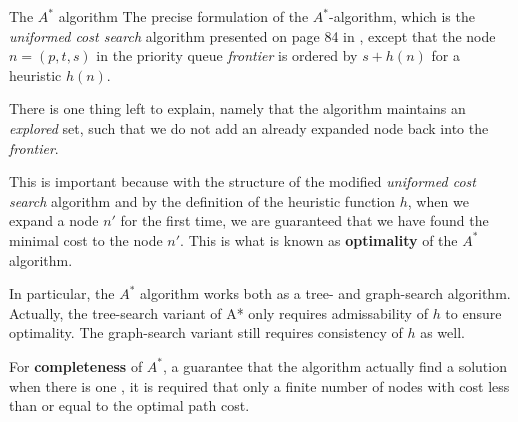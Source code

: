 \newpage
\begin{subsection}{The $A^*$ algorithm}
      \begingroup
      \setlength{\parskip}{0.1em}
  The precise formulation of the $A^*$-algorithm, which is the \textit{uniformed cost search} algorithm presented on page 84 in \cite{rn}, except that the node $n = (p, t, s)$ in the priority queue \textit{frontier} is ordered by $s + h(n)$ for a heuristic $h(n)$.
  \endgroup

  
  There is one thing left to explain, namely that the algorithm maintains an \textit{explored} set, such that we do not add an already expanded node back into the \textit{frontier}.

  This is important because with the structure of the modified \textit{uniformed cost search} algorithm and by the definition of the heuristic function $h$, when we expand a node $n'$ for the first time, we are guaranteed that we have found the minimal cost to the node $n'$. This is what is known as \textbf{optimality} of the $A^*$ algorithm.

  In particular, the $A^*$ algorithm works both as a tree- and graph-search algorithm. Actually, the tree-search variant of A* only requires admissability of $h$ to ensure optimality. The graph-search variant still requires consistency of $h$ as well.

  For \textbf{completeness} of $A^*$, a guarantee that the algorithm actually find a solution when there is one \cite{rn}, it is required that only a finite number of nodes with cost less than or equal to the optimal path cost.

  
\end{subsection}

